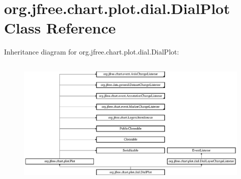 \hypertarget{classorg_1_1jfree_1_1chart_1_1plot_1_1dial_1_1_dial_plot}{}\section{org.\+jfree.\+chart.\+plot.\+dial.\+Dial\+Plot Class Reference}
\label{classorg_1_1jfree_1_1chart_1_1plot_1_1dial_1_1_dial_plot}
Inheritance diagram for org.\+jfree.\+chart.\+plot.\+dial.\+Dial\+Plot\+:\begin{figure}[H]
\begin{center}
\leavevmode
\includegraphics[height=6.263982cm]{classorg_1_1jfree_1_1chart_1_1plot_1_1dial_1_1_dial_plot}
\end{center}
\end{figure}
